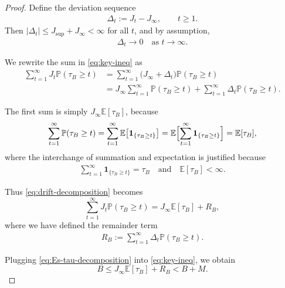 \begin{proof}
Define the deviation sequence
\begin{align*}
  \Delta_t := J_t - J_\infty, \qquad t\geq 1.
\end{align*}
Then $|\Delta_t|\leq J_{\sup} + J_\infty <\infty$ for all $t$, and by assumption,
\begin{align*}
  \Delta_t \longrightarrow 0
  \quad\text{as } t\to\infty.
\end{align*}

We rewrite the sum in \eqref{eq:key-ineq} as
\begin{align}
  \sum_{t=1}^\infty J_t\mathbb{P}(\tau_B\geq t)
  &= \sum_{t=1}^\infty \bigl(J_\infty + \Delta_t\bigr)\mathbb{P}(\tau_B\geq t)
  \nonumber\\
  &= J_\infty \sum_{t=1}^\infty \mathbb{P}(\tau_B\geq t)
     + \sum_{t=1}^\infty \Delta_t \mathbb{P}(\tau_B\geq t).
  \label{eq:drift-decomposition}
\end{align}

The first sum is simply $J_\infty \mathbb{E}[\tau_B]$, because
\begin{align*}
  \sum_{t=1}^\infty \mathbb{P}(\tau_B\geq t)
  = \sum_{t=1}^\infty \mathbb{E}\bigl[\mathbf{1}_{\{\tau_B\geq t\}}\bigr]
  = \mathbb{E}\Bigl[\sum_{t=1}^\infty \mathbf{1}_{\{\tau_B\geq t\}}\Bigr]
  = \mathbb{E}[\tau_B],
\end{align*}
where the interchange of summation and expectation is justified because
\begin{align*}
  \sum_{t=1}^\infty \mathbf{1}_{\{\tau_B\geq t\}} = \tau_B
  \quad\text{and}\quad \mathbb{E}[\tau_B]<\infty.
\end{align*}

Thus \eqref{eq:drift-decomposition} becomes
\begin{equation}
  \sum_{t=1}^\infty J_t\mathbb{P}(\tau_B\geq t)
  = J_\infty\mathbb{E}[\tau_B]
    + R_B,
  \label{eq:Es-tau-decomposition}
\end{equation}
where we have defined the remainder term
\begin{align*}
  R_B := \sum_{t=1}^\infty \Delta_t\mathbb{P}(\tau_B\geq t).
\end{align*}

Plugging \eqref{eq:Es-tau-decomposition} into \eqref{eq:key-ineq}, we obtain
\begin{equation}
  B
  \leq
  J_\infty\mathbb{E}[\tau_B] + R_B
  <
  B+M.
  \label{eq:key-ineq-with-RB}
\end{equation}

\medskip



\end{proof}
